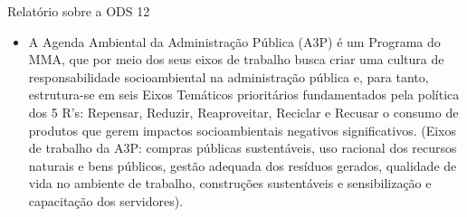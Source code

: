 \documentclass{beamer}
\begin{document}
\begin{frame}[allowframebreaks]{Relatório sobre a ODS 12}
\begin{itemize}
			\item A Agenda Ambiental da Administração Pública (A3P) é um Programa do MMA, que por meio dos seus eixos de trabalho busca criar uma cultura de responsabilidade socioambiental na administração pública e, para tanto, estrutura-se em seis Eixos Temáticos prioritários fundamentados pela política dos 5 R’s: Repensar, Reduzir, Reaproveitar, Reciclar e Recusar o consumo de produtos que gerem impactos socioambientais negativos significativos. (Eixos de trabalho da A3P: compras públicas sustentáveis, uso racional dos recursos naturais e bens públicos, gestão adequada dos resíduos gerados, qualidade de vida no ambiente de trabalho, construções sustentáveis e sensibilização e capacitação dos servidores).	
		\end{itemize}

	\end{frame}
\end{document}
